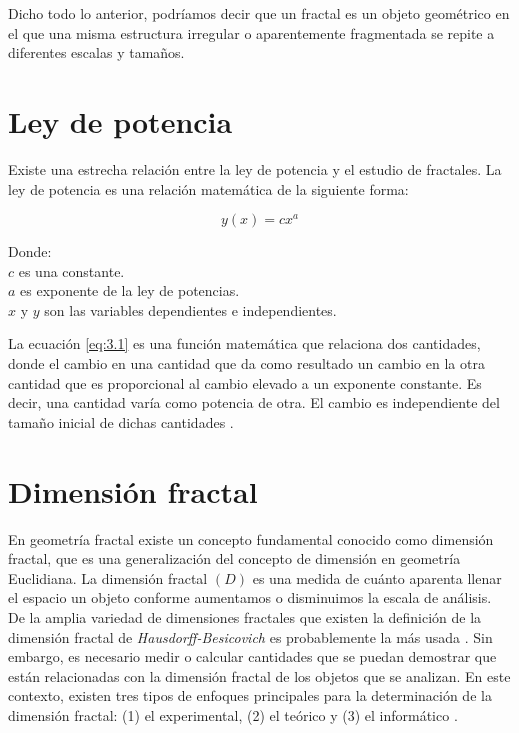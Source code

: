 Dicho todo lo anterior, podríamos decir que un fractal es un objeto geométrico en el que una misma estructura irregular o aparentemente fragmentada se repite a diferentes escalas y tamaños. 

\section{Ley de potencia} 

Existe una estrecha relación entre la ley de potencia y el estudio de fractales. La ley de potencia es una relación matemática de la siguiente forma:

\begin{equation}
	y(x) = cx^{a}
	\label{eq:3.1}
\end{equation}

Donde:\\
$c$ es una constante.\\
$a$ es exponente de la ley de potencias.\\
$x$ y $y$ son las variables dependientes e independientes. 

La ecuación \ref{eq:3.1} es una función matemática que relaciona dos cantidades, donde el cambio en una cantidad que da como resultado un cambio en la otra cantidad que es proporcional al cambio elevado a un exponente constante. Es decir, una cantidad varía como potencia de otra. El cambio es independiente del tamaño inicial de dichas cantidades \cite{Meakin1998}.

\color{blue}

\section{Dimensi\'{o}n fractal}

En geometr\'{i}a fractal existe un concepto fundamental conocido como dimensi\'{o}n fractal, que es una generalizaci\'{o}n del concepto de dimensi\'{o}n en geometr\'{i}a Euclidiana. La dimensi\'{o}n fractal $(D)$ es una medida de cu\'{a}nto aparenta llenar el espacio un objeto conforme aumentamos o disminuimos la escala de an\'{a}lisis. De la  amplia variedad de dimensiones fractales que existen la definición de la dimensión fractal de \textit{Hausdorff-Besicovich} es probablemente la más usada \cite{Vicsek1992, Meakin1998}. Sin embargo, es necesario medir o calcular cantidades que se puedan demostrar que est\'{a}n relacionadas con la dimensi\'{o}n fractal de los objetos que se analizan. En este contexto, existen  tres tipos de enfoques principales para la determinaci\'{o}n de la dimensión fractal: (1) el experimental, (2) el te\'{o}rico y (3) el inform\'{a}tico \cite{Vicsek1992}.

